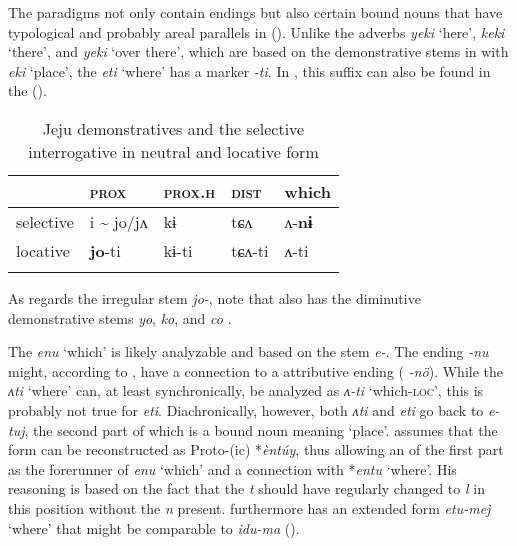 The paradigms not only contain  endings but also certain bound nouns that have typological and probably areal parallels in  (). Unlike the adverbs \textit{yeki} ‘here’, \textit{keki} ‘there’, and \textit{yeki} ‘over there’, which are based on the demonstrative stems in  with \textit{eki} ‘place’, the  \textit{eti} ‘where’ has a  marker \textit{-ti}. In , this suffix can also be found in the  ().

\begin{table}
\caption{Jeju demonstratives and the selective interrogative in neutral and locative form \citep[21]{Saltzman2014}}
\label{tab:kore:11}

\begin{tabularx}{\textwidth}{XXXXl}
\lsptoprule
& \textbf{\textsc{prox}} & \textbf{\textsc{prox.h}} & \textbf{\textsc{dist}} & \textbf{which}\\
\midrule
selective & i {\textasciitilde} jo/jʌ & kɨ & tɕʌ & ʌ-\textbf{nɨ}\\
locative & \textbf{jo}-ti & kɨ-ti & tɕʌ-ti & ʌ-ti\\
\lspbottomrule
\end{tabularx}
\end{table}

As regards the irregular  stem \textit{jo-}, note that  also has the diminutive demonstrative stems \textit{yo}, \textit{ko}, and \textit{co} \citep[114]{Sohn1994}.

The  \textit{enu} ‘which’ is likely analyzable and based on the stem \textit{e-}. The ending \textit{-nu} might, according to \citet[322]{Vovin2005}, have a connection to a  attributive ending ( \textit{-nö}). While the   \textit{ʌti} ‘where’ can, at least synchronically, be analyzed as \textit{ʌ-ti} ‘which-\textsc{loc}’, this is probably not true for  \textit{eti}. Diachronically, however, both  \textit{ʌti} and  \textit{eti} go back to  \textit{e-tuj}, the second part of which is a bound noun meaning ‘place’. \citet[322]{Vovin2005} assumes that the form can be reconstructed as Proto-(ic) *\textit{èntúy}, thus allowing an  of the first part as the forerunner of  \textit{enu} ‘which’ and a connection with  *\textit{entu} ‘where’. His reasoning is based on the fact that the \textit{t} should have regularly changed to \textit{l} in this position without the \textit{n} present.  furthermore has an extended form \textit{etu-mej} ‘where’ that might be comparable to  \textit{idu-ma} ().


